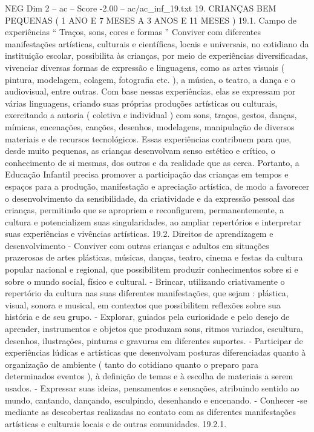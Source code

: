 \begin{textsample}{NEG Dim 2 – ac – Score -2.00 – ac/ac\_inf\_19.txt}  \label{ex:f2_neg_127}
19.
CRIANÇAS BEM PEQUENAS ( 1 ANO E 7 MESES A 3 ANOS E 11 MESES ) 19.1.
Campo de experiências “ Traços, sons, cores e formas ” Conviver com diferentes manifestações artísticas, culturais e científicas, locais e universais, no cotidiano da instituição escolar, possibilita às crianças, por meio de experiências diversificadas, vivenciar diversas formas de expressão e linguagens, como as artes visuais ( pintura, modelagem, colagem, fotografia etc. ), a música, o teatro, a dança e o audiovisual, entre outras.
Com base nessas experiências, elas se expressam por várias linguagens, criando suas próprias produções artísticas ou culturais, exercitando a autoria ( coletiva e individual ) com sons, traços, gestos, danças, mímicas, encenações, canções, desenhos, modelagens, manipulação de diversos materiais e de recursos tecnológicos.
Essas experiências contribuem para que, desde muito pequenas, as crianças desenvolvam senso estético e crítico, o conhecimento de si mesmas, dos outros e da realidade que as cerca.
Portanto, a Educação Infantil precisa promover a participação das crianças em tempos e espaços para a produção, manifestação e apreciação artística, de modo a favorecer o desenvolvimento da sensibilidade, da criatividade e da expressão pessoal das crianças, permitindo que se apropriem e reconfigurem, permanentemente, a cultura e potencializem suas singularidades, ao ampliar repertórios e interpretar suas experiências e vivências artísticas. 19.2.
Direitos de aprendizagem e desenvolvimento - Conviver com outras crianças e adultos em situações prazerosas de artes plásticas, músicas, danças, teatro, cinema e festas da cultura popular nacional e regional, que possibilitem produzir conhecimentos sobre si e sobre o mundo social, físico e cultural. - Brincar, utilizando criativamente o repertório da cultura nas suas diferentes manifestações, que sejam : plástica, visual, sonora e musical, em contextos que possibilitem reflexões sobre sua história e de seu grupo. - Explorar, guiados pela curiosidade e pelo desejo de aprender, instrumentos e objetos que produzam sons, ritmos variados, escultura, desenhos, ilustrações, pinturas e gravuras em diferentes suportes. - Participar de experiências lúdicas e artísticas que desenvolvam posturas diferenciadas quanto à organização de ambiente ( tanto do cotidiano quanto o preparo para determinados eventos ), à definição de temas e à escolha de materiais a serem usados. - Expressar suas ideias, pensamentos e sensações, atribuindo sentido ao mundo, cantando, dançando, esculpindo, desenhando e encenando. - Conhecer -se mediante as descobertas realizadas no contato com as diferentes manifestações artísticas e culturais locais e de outras comunidades. 19.2.1.

\end{textsample}
